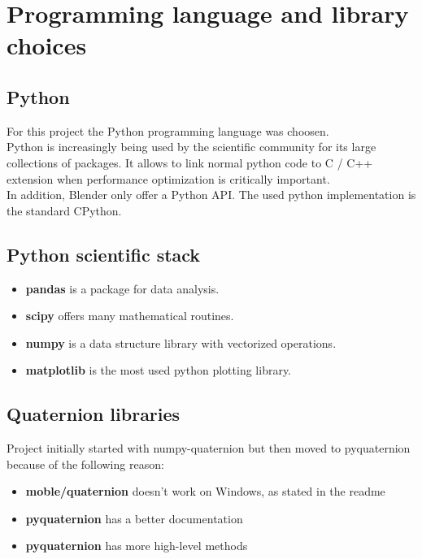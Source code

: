 \chapter{Programming language and library choices}
\label{chap:programming_language_library_choices}

\section{Python}
For this project the Python programming language \cite{python-website} was choosen. \\
Python is increasingly being used by the scientific community for its large collections of packages. It allows to link normal python code to C / C++ extension when performance optimization is critically important. \\
In addition, Blender only offer a Python API.
The used python implementation is the standard CPython. \\

\section{Python scientific stack}
\begin{itemize}
	\item \textbf{pandas} is a package for data analysis.
	\item \textbf{scipy} offers many mathematical routines.
	\item \textbf{numpy} is a data structure library with vectorized operations. %
	\item \textbf{matplotlib} is the most used python plotting library.
\end{itemize}

\section{Quaternion libraries}

Project initially started with numpy-quaternion \cite{numpy-quaternion} but then moved to pyquaternion \cite{pyquaternion} because of the following reason:
\begin{itemize}
\item \textbf{moble/quaternion} doesn't work on Windows, as stated in the readme
\item \textbf{pyquaternion} has a better documentation
\item \textbf{pyquaternion} has more high-level methods
\end{itemize}

